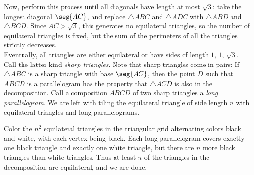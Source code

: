 Now, perform this process until all diagonals have length at most $\sqrt3$: take the longest diagonal $\seg{AC}$, and replace $\triangle ABC$ and $\triangle ADC$ with $\triangle ABD$ and $\triangle BCD$. Since $AC>\sqrt3$, this generates no equilateral triangles, so the number of equilateral triangles is fixed, but the sum of the perimeters of all the triangles strictly decreases.\\

Eventually, all triangles are either equilateral or have sides of length $1$, $1$, $\sqrt3$. Call the latter kind \emph{sharp triangles}. Note that sharp triangles come in pairs: If $\triangle ABC$ is a sharp triangle with base $\seg{AC}$, then the point $D$ such that $ABCD$ is a parallelogram has the property that $\triangle ACD$ is also in the decomposition. Call a composition $ABCD$ of two sharp triangles a \emph{long parallelogram}. We are left with tiling the equilateral triangle of side length $n$ with equilateral triangles and long parallelograms.

Color the $n^2$ equilateral triangles in the triangular grid alternating colors black and white, with each vertex being black. Each long parallelogram covers exactly one black triangle and exactly one white triangle, but there are $n$ more black triangles than white triangles. Thus at least $n$ of the triangles in the decomposition are equilateral, and we are done.
